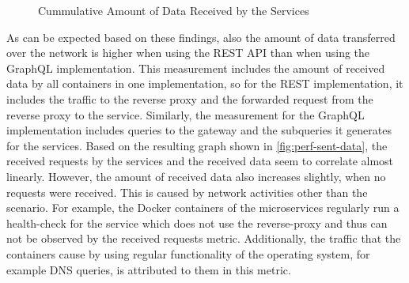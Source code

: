 \begin{figure}[t!]
    \centering
    \caption{Cummulative Amount of Data Received by the Services}\label{fig:perf-sent-data}    
\end{figure}

As can be expected based on these findings, also the amount of data transferred over the network is higher when using the \ac{REST} \ac{API} than when using the GraphQL implementation.
This measurement includes the amount of received data by all containers in one implementation, so for the \ac{REST} implementation, it includes the traffic to the reverse proxy and the forwarded request from the reverse proxy to the service.
Similarly, the measurement for the GraphQL implementation includes queries to the gateway and the subqueries it generates for the services.
Based on the resulting graph shown in \autoref{fig:perf-sent-data}, the received requests by the services and the received data seem to correlate almost linearly.
However, the amount of received data also increases slightly, when no requests were received.
This is caused by network activities other than the scenario.
For example, the Docker containers of the microservices regularly run a health-check for the service which does not use the reverse-proxy and thus can not be observed by the received requests metric.
Additionally, the traffic that the containers cause by using regular functionality of the operating system, for example \ac{DNS} queries, is attributed to them in this metric.


